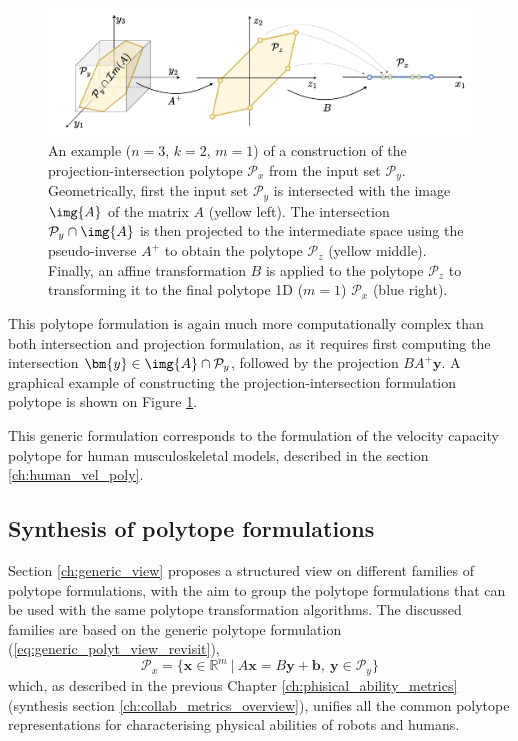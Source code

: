 \begin{figure}
    \centering
    \includegraphics[width=\linewidth]{Chapters/imgs/spec_proj_int.pdf}
    \caption{An example ($n=3$, $k=2$, $m=1$) of a construction of the projection-intersection polytope $\mathcal{P}_x$ from the input set $\mathcal{P}_y$. 
    Geometrically, first the input set $\mathcal{P}_y$ is intersected with the image $\img{A}$ of the matrix $A$ (yellow left). The intersection $\mathcal{P}_y\cap\img{A}$ is then projected to the intermediate space using the pseudo-inverse $A^+$ to obtain the polytope $\mathcal{P}_z$ (yellow middle). Finally, an affine transformation $B$ is applied to the polytope $\mathcal{P}_z$ to transforming it to the final polytope 1D ($m=1$) $\mathcal{P}_x$ (blue right).}
    \label{fig:proj_inter_spec}
\end{figure}
This polytope formulation is again much more computationally complex than both intersection and projection formulation, as it requires first computing the intersection $\bm{y} \in \img{A}\cap\mathcal{P}_y$, followed by the projection $BA^{+}\bm{y}$. A graphical example of constructing the projection-intersection formulation polytope is shown on Figure \ref{fig:proj_inter_spec}.

\begin{remark}
    This generic formulation corresponds to the formulation of the velocity capacity polytope for human musculoskeletal models, described in the section \ref{ch:human_vel_poly}.
\end{remark}


\subsection{Synthesis of polytope formulations}
\label{ch:which_metric_which_formulation}

Section \ref{ch:generic_view} proposes a structured view on different families of polytope formulations, with the aim to group the polytope formulations that can be used with the same polytope transformation algorithms. The discussed families are based on the generic polytope formulation (\ref{eq:generic_polyt_view_revisit}), 
\begin{equation}
    \mathcal{P}_x = \{\bm{x}\in\mathbb{R}^m ~|~ A\bm{x}=B\bm{y} + \bm{b}, ~ \bm{y}\in\mathcal{P}_y\}
    \label{eq:generic_polyt_view_revisit2}
\end{equation}
which, as described in the previous Chapter \ref{ch:phisical_ability_metrics} (synthesis section \ref{ch:collab_metrics_overview}), unifies all the common polytope representations for characterising physical abilities of robots and humans. 

